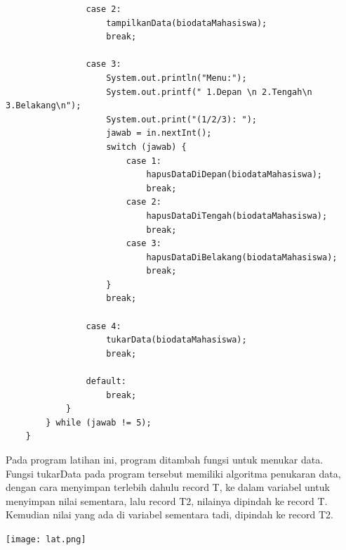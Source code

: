 \documentclass[a4paper,12pt]{article}
\begin{document}
\begin{lstlisting}
                case 2:
                    tampilkanData(biodataMahasiswa);
                    break;

                case 3:
                    System.out.println("Menu:");
                    System.out.printf(" 1.Depan \n 2.Tengah\n 3.Belakang\n");
                    System.out.print("(1/2/3): ");
                    jawab = in.nextInt();
                    switch (jawab) {
                        case 1:
                            hapusDataDiDepan(biodataMahasiswa);
                            break;
                        case 2:
                            hapusDataDiTengah(biodataMahasiswa);
                            break;
                        case 3:
                            hapusDataDiBelakang(biodataMahasiswa);
                            break;
                    }
                    break;

                case 4:
                    tukarData(biodataMahasiswa);
                    break;

                default:
                    break;
            }
        } while (jawab != 5);
    }
\end{lstlisting}
Pada program latihan ini, program ditambah fungsi untuk menukar data.\\
Fungsi tukarData pada program tersebut memiliki algoritma penukaran data,
dengan cara menyimpan terlebih dahulu record T, ke dalam variabel untuk
menyimpan nilai sementara, lalu record T2, nilainya dipindah ke record T.
Kemudian nilai yang ada di variabel sementara tadi, dipindah ke record T2.
\begin{center}
    \texttt{[image: lat.png]} 
\end{center}

\newpage
\end{document}
